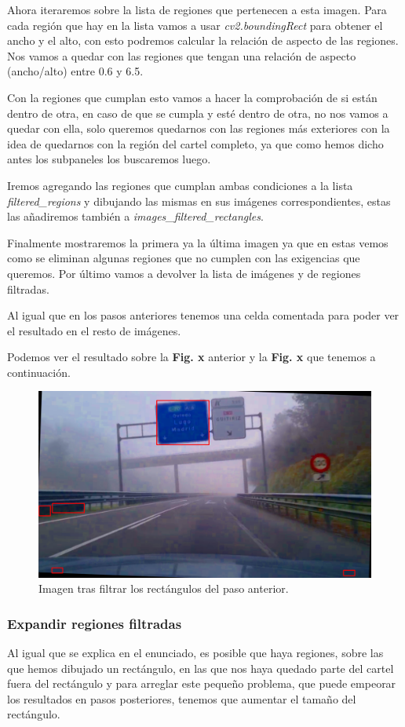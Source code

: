 \documentclass[a4paper, 12pt]{article}
\begin{document}
Ahora iteraremos sobre la lista de regiones que pertenecen a esta imagen. Para cada región que hay en la lista vamos a usar \textit{cv2.boundingRect} para obtener el ancho y el alto, con esto podremos calcular la relación de aspecto de las regiones. Nos vamos a quedar con las regiones que tengan una relación de aspecto (ancho/alto) entre 0.6 y 6.5. 


Con la regiones que cumplan esto vamos a hacer la comprobación de si están dentro de otra, en caso de que se cumpla y esté dentro de otra, no nos vamos a quedar con ella, solo queremos quedarnos con las regiones más exteriores con la idea de quedarnos con la región del cartel completo, ya que como hemos dicho antes los subpaneles los buscaremos luego.

Iremos agregando las regiones que cumplan ambas condiciones a la lista \textit{filtered\_regions} y dibujando las mismas en sus imágenes correspondientes, estas las añadiremos también a \textit{images\_filtered\_rectangles}.

Finalmente mostraremos la primera ya la última imagen ya que en estas vemos como se eliminan algunas regiones que no cumplen con las exigencias que queremos. Por último vamos a devolver la lista de imágenes y de regiones filtradas.

Al igual que en los pasos anteriores tenemos una celda comentada para poder ver el resultado en el resto de imágenes. 

Podemos ver el resultado sobre la \textbf{Fig. x} anterior y la \textbf{Fig. x} que tenemos a continuación.
\begin{figure}[h]
	\centering
	\includegraphics[width=0.6\linewidth]{img/RectangulosFiltrados}
	\caption{Imagen tras filtrar los rectángulos del paso anterior.}
	\label{fig:RectangulosFiltrados}
\end{figure}


\subsubsection{Expandir regiones filtradas}
Al igual que se explica en el enunciado, es posible que haya regiones, sobre las que hemos dibujado un rectángulo, en las que nos haya quedado parte del cartel fuera del rectángulo y para arreglar este pequeño problema, que puede empeorar los resultados en pasos posteriores, tenemos que aumentar el tamaño del rectángulo.
\end{document}
